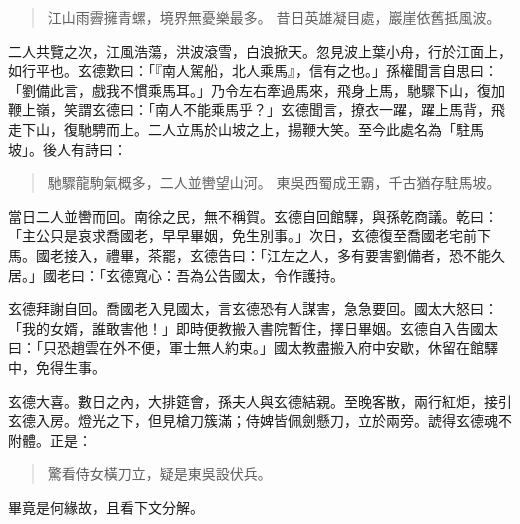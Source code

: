 \begin{quote}
江山雨霽擁青螺，境界無憂樂最多。
昔日英雄凝目處，巖崖依舊抵風波。
\end{quote}

二人共覽之次，江風浩蕩，洪波滾雪，白浪掀天。忽見波上葉小舟，行於江面上，如行平也。玄德歎曰：「『南人駕船，北人乘馬』，信有之也。」孫權聞言自思曰：「劉備此言，戲我不慣乘馬耳。」乃令左右牽過馬來，飛身上馬，馳驟下山，復加鞭上嶺，笑謂玄德曰：「南人不能乘馬乎？」玄德聞言，撩衣一躍，躍上馬背，飛走下山，復馳騁而上。二人立馬於山坡之上，揚鞭大笑。至今此處名為「駐馬坡」。後人有詩曰：

\begin{quote}
馳驟龍駒氣概多，二人並轡望山河。
東吳西蜀成王霸，千古猶存駐馬坡。
\end{quote}

當日二人並轡而回。南徐之民，無不稱賀。玄德自回館驛，與孫乾商議。乾曰：「主公只是哀求喬國老，早早畢姻，免生別事。」次日，玄德復至喬國老宅前下馬。國老接入，禮畢，茶罷，玄德告曰：「江左之人，多有要害劉備者，恐不能久居。」國老曰：「玄德寬心：吾為公告國太，令作護持。

玄德拜謝自回。喬國老入見國太，言玄德恐有人謀害，急急要回。國太大怒曰：「我的女婿，誰敢害他！」即時便教搬入書院暫住，擇日畢姻。玄德自入告國太曰：「只恐趙雲在外不便，軍士無人約束。」國太教盡搬入府中安歇，休留在館驛中，免得生事。

玄德大喜。數日之內，大排筵會，孫夫人與玄德結親。至晚客散，兩行紅炬，接引玄德入房。燈光之下，但見槍刀簇滿；侍婢皆佩劍懸刀，立於兩旁。諕得玄德魂不附體。正是：

\begin{quote}
驚看侍女橫刀立，疑是東吳設伏兵。
\end{quote}

畢竟是何緣故，且看下文分解。
